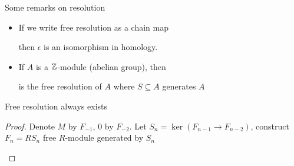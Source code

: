 \documentclass{report}
\begin{document}
\begin{remark}
    Some remarks on resolution
    \begin{itemize}
        \item If we write free resolution as a chain map
        \begin{center}
        \end{center}
        then $\epsilon$ is an isomorphism in homology.
    
        \item If $A$ is a $\mathbb{Z}$-module (abelian group), then  is the free resolution of $A$ where $S \subseteq A$ generates $A$
    \end{itemize}
\end{remark}

\begin{proposition}
    Free resolution always exists
\end{proposition}

\begin{proof}
    Denote $M$ by $F_{-1}$, $0$ by $F_{-2}$. Let $S_n = \ker (F_{n-1} \to F_{n-2})$, construct $F_n = R S_n$ free $R$-module generated by $S_n$
    \begin{center}
    \end{center}

\end{proof} 
\end{document}
